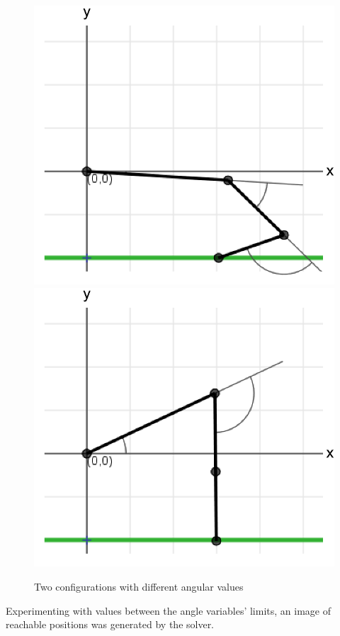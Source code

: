 \documentclass{article}
\begin{document}
\begin{figure}[h!]
\centering
\includegraphics[scale=0.2]{substitute1.png}
\includegraphics[scale=0.2]{substitute2.png}
\caption{Two configurations with different angular values}
\end{figure}

Experimenting with values between the angle variables' limits, an image of reachable positions was generated by the solver.
\end{document}
